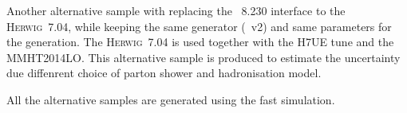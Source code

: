 Another alternative sample with replacing the {\PYTHIA}~8.230 interface
to the \textsc{Herwig}~7.04, while keeping the same generator (\powhegbox~v2)
and same parameters for the generation. 
The \textsc{Herwig}~7.04 is used together with the H7UE tune and
the MMHT2014\textsc{LO}.
This alternative sample is produced to estimate the uncertainty
due diffenrent choice of parton shower and hadronisation model. 

All the alternative samples are generated using the fast simulation. 





